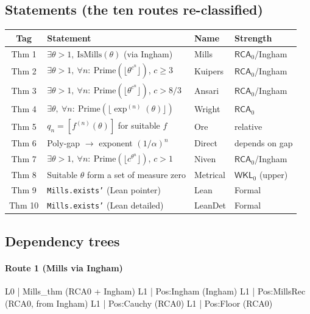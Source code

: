 \documentclass[11pt,reqno]{amsart}
\theoremstyle{redplain}
\numberwithin{equation}{section}
\begin{document}
\subsection{Statements (the ten routes re-classified)}
\label{sec:statements-tab}

\begin{center}
{\small
\begin{tabular}{|c|m{5.4cm}|m{2.4cm}|m{1.8cm}|}
\hline
\textbf{Tag} & \textbf{Statement} & \textbf{Name} & \textbf{Strength}\\
\hline
Thm 1 & $\exists\theta>1,\ \mathrm{IsMills}(\theta)$ (via Ingham) & Mills & $\mathsf{RCA}_0$/Ingham \\
\hline
Thm 2 & $\exists\theta>1,\ \forall n:\ \mathrm{Prime}(\lfloor\theta^{c^n}\rfloor)$, $c\ge3$ & Kuipers & $\mathsf{RCA}_0$/Ingham \\
\hline
Thm 3 & $\exists\theta>1,\ \forall n:\ \mathrm{Prime}(\lfloor\theta^{c^n}\rfloor)$, $c>8/3$ & Ansari & $\mathsf{RCA}_0$/Ingham \\
\hline
Thm 4 & $\exists\theta,\ \forall n:\ \mathrm{Prime}(\lfloor\exp^{(n)}(\theta)\rfloor)$ & Wright & $\mathsf{RCA}_0$ \\
\hline
Thm 5 & $q_n=[f^{(n)}(\theta)]$ for suitable $f$ & Ore & relative \\
\hline
Thm 6 & Poly-gap $\to$ exponent $(1/\alpha)^n$ & Direct & depends on gap \\
\hline
Thm 7 & $\exists\theta>1,\ \forall n:\ \mathrm{Prime}(\lfloor c^{\theta^n}\rfloor)$, $c>1$ & Niven & $\mathsf{RCA}_0$/Ingham \\
\hline
Thm 8 & Suitable $\theta$ form a set of measure zero & Metrical & $\mathsf{WKL}_0$ (upper) \\
\hline
Thm 9 & \texttt{Mills.exists'} (Lean pointer) & Lean & Formal \\
\hline
Thm 10 & \texttt{Mills.exists'} (Lean detailed) & LeanDet & Formal \\
\hline
\end{tabular}
}
\end{center}

\subsection{Dependency trees}
\label{sec:trees}

\paragraph{Route 1 (Mills via Ingham)}
\begin{verbatimbox}
L0 | Mills_thm                          (RCA0 + Ingham)
L1 |   Pos:Ingham                       (Ingham)
L1 |   Pos:MillsRec                     (RCA0, from Ingham)
L1 |   Pos:Cauchy                       (RCA0)
L1 |   Pos:Floor                        (RCA0)
\end{verbatimbox}
\end{document}

